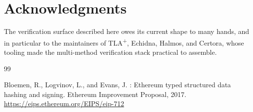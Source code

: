 \documentclass[11pt,a4paper]{article}
\theoremstyle{definition}
\theoremstyle{remark}
\begin{document}
\section*{Acknowledgments}
The verification surface described here owes its current shape to
many hands, and in particular to the maintainers of
TLA\textsuperscript{+}, Echidna, Halmos, and Certora, whose tooling
made the multi-method verification stack practical to assemble.



\begin{thebibliography}{99}

Bloemen, R., Logvinov, L., and Evans, J.
: Ethereum typed structured data hashing and signing.
\newblock Ethereum Improvement Proposal, 2017.
\newblock \url{https://eips.ethereum.org/EIPS/eip-712}

\end{thebibliography}
\end{document}
